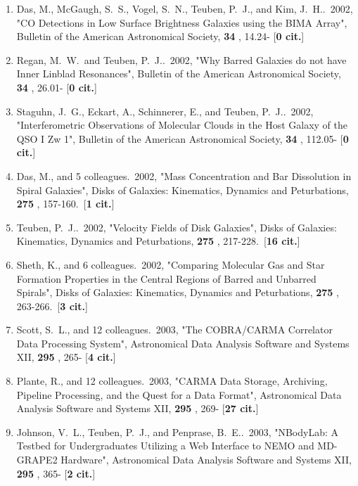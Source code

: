 \documentclass[11pt,letterpaper]{article}
\begin{document}
\begin{enumerate}[resume,label=\textbf{\arabic*}.]
\item  
Das, M., McGaugh, S.~S., Vogel, S.~N., Teuben, P.~J., and Kim, J.~H..\  
2002,  "CO Detections in Low Surface Brightness Galaxies using the BIMA 
Array", Bulletin of the American Astronomical Society,  {\bf 34} , 14.24- 
[{\bf 0 cit.}] 

\item  
Regan, M.~W.~and Teuben, P.~J..\  2002,  "Why Barred Galaxies do not have 
Inner Linblad Resonances", Bulletin of the American Astronomical Society,  
{\bf 34} , 26.01- [{\bf 0 cit.}] 

\item  
Staguhn, J.~G., Eckart, A., Schinnerer, E., and Teuben, P.~J..\  2002,  
"Interferometric Observations of Molecular Clouds in the Host Galaxy of the 
QSO I Zw 1", Bulletin of the American Astronomical Society,  {\bf 34} , 
112.05- [{\bf 0 cit.}] 

\item  
Das, M., and 5 colleagues.\  2002,  "Mass Concentration and Bar Dissolution 
in Spiral Galaxies", Disks of Galaxies: Kinematics, Dynamics and 
Peturbations,  {\bf 275} , 157-160.\  [{\bf 1 cit.}] 

\item  
Teuben, P.~J..\  2002,  "Velocity Fields of Disk Galaxies", Disks of 
Galaxies: Kinematics, Dynamics and Peturbations,  {\bf 275} , 217-228.\  
[{\bf 16 cit.}] 

\item  
Sheth, K., and 6 colleagues.\  2002,  "Comparing Molecular Gas and Star 
Formation Properties in the Central Regions of Barred and Unbarred 
Spirals", Disks of Galaxies: Kinematics, Dynamics and Peturbations,  {\bf 
275} , 263-266.\  [{\bf 3 cit.}] 

\item  
Scott, S.~L., and 12 colleagues.\  2003,  "The COBRA/CARMA Correlator Data 
Processing System", Astronomical Data Analysis Software and Systems XII,  
{\bf 295} , 265- [{\bf 4 cit.}] 

\item  
Plante, R., and 12 colleagues.\  2003,  "CARMA Data Storage, Archiving, 
Pipeline Processing, and the Quest for a Data Format", Astronomical Data 
Analysis Software and Systems XII,  {\bf 295} , 269- [{\bf 27 cit.}] 

\item  
Johnson, V.~L., Teuben, P.~J., and Penprase, B.~E..\  2003,  "NBodyLab: A 
Testbed for Undergraduates Utilizing a Web Interface to NEMO and MD-GRAPE2 
Hardware", Astronomical Data Analysis Software and Systems XII,  {\bf 295} 
, 365- [{\bf 2 cit.}] 


\end{enumerate}
\end{document}

